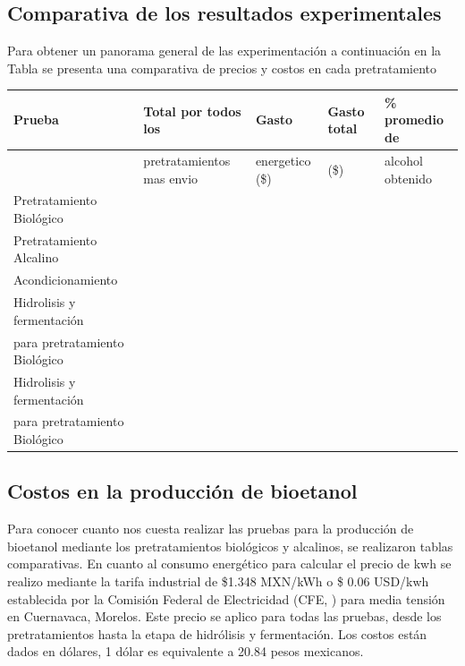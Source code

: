 \documentclass[12pt]{article}
\begin{document}
 	
			\subsection{Comparativa de los resultados experimentales}
			
			Para obtener un panorama general de las experimentación a continuación en la Tabla se presenta una comparativa de precios y costos en cada pretratamiento
		
		
	\begin{table}[H]
		\centering
		\resizebox{16cm}{!} {
		\begin{tabular}{|l|l|l|l|l|}
			\hline
			Prueba & Total por todos los  & Gasto  & Gasto total & \% promedio de  \\ \hline
			~ &  pretratamientos mas envio &  energetico (\$) &   (\$) &  alcohol obtenido  \\ \hline
			Pretratamiento Biológico & ~ & ~ & ~ &   \\ \hline
			Pretratamiento Alcalino & ~ & ~ & ~ &   \\ \hline
			Acondicionamiento & ~ & ~ & ~ &   \\ \hline
			Hidrolisis y fermentación  & ~ & ~ & ~ &   \\ \hline
			para pretratamiento Biológico & ~ & ~ & ~ &   \\ \hline
			Hidrolisis y fermentación  & ~ & ~ & ~ &   \\ \hline
			para pretratamiento Biológico & ~ & ~ & ~ &   \\ \hline
		\end{tabular}	}
	\end{table}
			
			\subsection{Costos en la producción de bioetanol}
	Para conocer cuanto nos cuesta realizar las pruebas para la producción de bioetanol mediante los pretratamientos biológicos y alcalinos, se realizaron tablas comparativas.
	En cuanto al consumo energético para calcular el precio de kwh se realizo mediante la tarifa industrial de \$1.348 MXN/kWh o \$ 0.06 USD/kwh establecida por la Comisión Federal de Electricidad (CFE, \cite{CFE2023}) para media tensión en Cuernavaca, Morelos. Este precio se aplico para todas las pruebas, desde los pretratamientos hasta la etapa de hidrólisis y fermentación. Los costos están dados en dólares, 1 dólar es equivalente a 20.84 pesos mexicanos.
			
\end{document}
